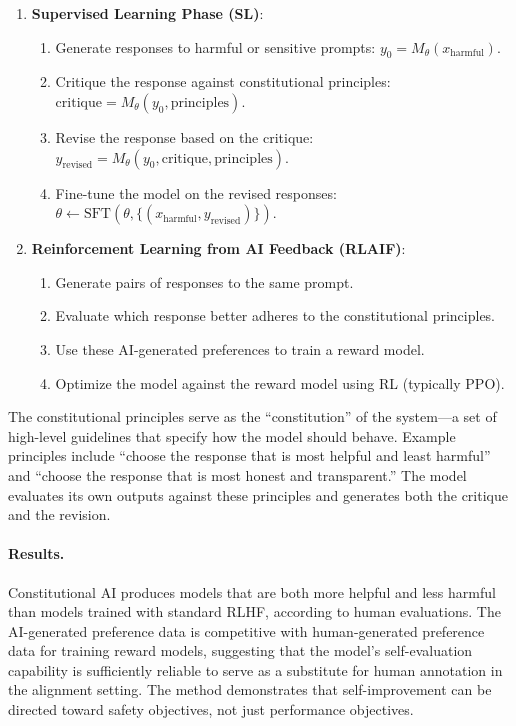 \begin{enumerate}
    \item \textbf{Supervised Learning Phase (SL)}:
    \begin{enumerate}
        \item Generate responses to harmful or sensitive prompts: $y_0 = M_\theta(x_{\text{harmful}})$.
        \item Critique the response against constitutional principles: $\mathrm{critique} = M_\theta(y_0, \text{principles})$.
        \item Revise the response based on the critique: $y_{\text{revised}} = M_\theta(y_0, \mathrm{critique}, \text{principles})$.
        \item Fine-tune the model on the revised responses: $\theta \leftarrow \mathrm{SFT}(\theta, \{(x_{\text{harmful}}, y_{\text{revised}})\})$.
    \end{enumerate}
    \item \textbf{Reinforcement Learning from AI Feedback (RLAIF)}:
    \begin{enumerate}
        \item Generate pairs of responses to the same prompt.
        \item Evaluate which response better adheres to the constitutional principles.
        \item Use these AI-generated preferences to train a reward model.
        \item Optimize the model against the reward model using RL (typically PPO).
    \end{enumerate}
\end{enumerate}

The constitutional principles serve as the ``constitution'' of the system---a set of high-level guidelines that specify how the model should behave. Example principles include ``choose the response that is most helpful and least harmful'' and ``choose the response that is most honest and transparent.'' The model evaluates its own outputs against these principles and generates both the critique and the revision.

\paragraph{Results.}
Constitutional AI produces models that are both more helpful and less harmful than models trained with standard RLHF, according to human evaluations. The AI-generated preference data is competitive with human-generated preference data for training reward models, suggesting that the model's self-evaluation capability is sufficiently reliable to serve as a substitute for human annotation in the alignment setting. The method demonstrates that self-improvement can be directed toward safety objectives, not just performance objectives.

